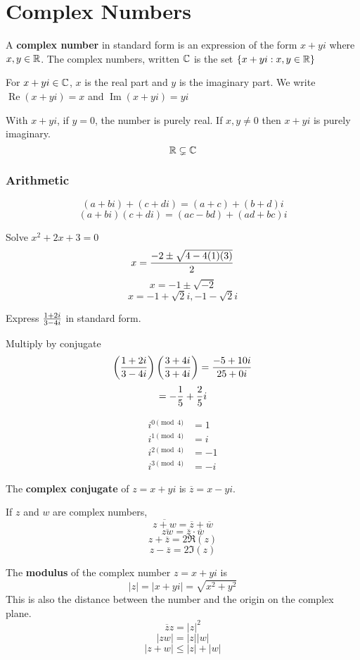 \documentclass[english, 12pt]{article}
\begin{document}
\section{Complex Numbers}
\begin{defn}
A \textbf{complex number} in standard form is an expression of the form $x+yi$ where $x,y \in {\mathbb{R}}$. The complex numbers, written ${\mathbb{C}}$ is the set $\{x+yi : x,y \in {\mathbb{R}} \}$
\end{defn}
\begin{exmp}
For $x+yi \in {\mathbb{C}}$, $x$ is the real part and $y$ is the imaginary part. We write $\operatorname{Re}(x+yi) = x$ and $\operatorname{Im}(x+yi) = yi$
\end{exmp}
\begin{defn}
With $x+yi$, if $y=0$, the number is purely real. If $x,y \neq 0$ then $x+yi$ is purely imaginary. 
\[ {\mathbb{R}} \subsetneq {\mathbb{C}} \]
\end{defn}
\subsubsection*{Arithmetic}
\[(a+bi) + (c+di) = (a+c) + (b+d)i \]
\[(a+bi)(c+di) = (ac-bd) + (ad + bc)i \]
\begin{exmp}
Solve $x^2 + 2x + 3 = 0$
\[ x = \frac{-2 \pm \sqrt{4 - 4(1)(3)}}{2} \]
\[ x = -1 \pm \sqrt{-2} \]
\[ x = -1 + \sqrt{2} i, -1 - \sqrt{2}i \]
\end{exmp}
\begin{exmp}
Express $\frac{1+2i}{3-4i}$ in standard form.
\begin{sol}
Multiply by conjugate
\[\left(\frac{1+2i}{3-4i}\right)\left(\frac{3+4i}{3+4i}\right) = \frac{-5 + 10i}{25 + 0i} \]
\[ = - \frac{1}{5} + \frac{2}{5} i \]
\end{sol}
\end{exmp}
\begin{thrm}
\begin{align*}
i^{0 \pmod 4} &= 1\\
i^{1 \pmod 4} &= i\\
i^{2 \pmod 4} &= -1\\
i^{3 \pmod 4} &= -i
\end{align*}
\end{thrm}
\begin{defn}
The \textbf{complex conjugate} of $z = x + yi$ is $\overline z = x - yi$.
\end{defn}
If $z$ and $w$ are complex numbers,
\[ \overline{z + w} = \overline{z} + \overline{w} \]
\[ \overline{zw} = \overline{z} \cdot \overline{w}\]
\[ z + \overline{z} = 2 \Re(z)\]
\[ z - \overline{z} = 2 \Im(z)\]
\begin{defn}
The \textbf{modulus} of the complex number $z = x + yi$ is 
\[ |z| = |x + yi| = \sqrt{x^2 + y^2} \]
This is also the distance between the number and the origin on the complex plane.
\[ \overline{z} z = |z|^2\]
\[ |zw| = |z| |w|\]
\[ |z+w| \leq |z| + |w|\]
\end{defn}
\end{document}
